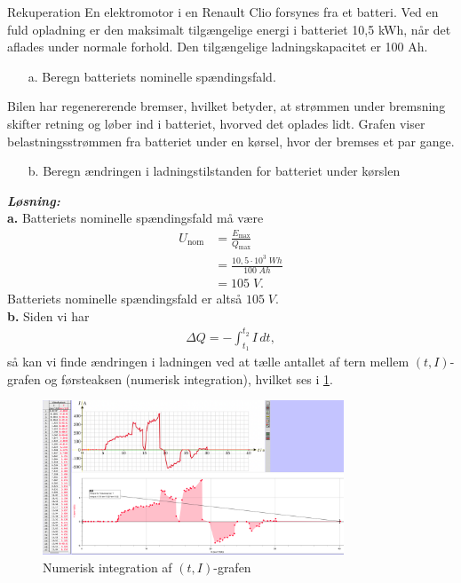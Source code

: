 \documentclass{report}
\newcommand{\sol}{\setlength{\parindent}{0cm}\textbf{\textit{Løsning:}}\setlength{\parindent}{1cm}}
\begin{document}
\begin{question}{Rekuperation}{}
  En elektromotor i en Renault Clio forsynes fra et batteri.
  Ved en fuld opladning er den maksimalt tilgængelige energi i batteriet 10,5 kWh, når det aflades under normale forhold.
  Den tilgængelige ladningskapacitet er 100 Ah.
  \begin{itemize}
    \item[a.] Beregn batteriets nominelle spændingsfald.
  \end{itemize}
Bilen har regenererende bremser, hvilket betyder, at strømmen under bremsning skifter retning og løber ind i batteriet, hvorved det oplades lidt.
Grafen viser belastningsstrømmen fra batteriet under en kørsel, hvor der bremses et par gange.
\begin{itemize}
  \item[b.] Beregn ændringen i ladningstilstanden for batteriet under kørslen
\end{itemize}
\end{question}
\sol \\
\textbf{a.}
Batteriets nominelle spændingsfald må være
\begin{equation*}
\begin{split}
  U _{\text{nom} }&=\frac{E _{\text{max} }}{Q _{\text{max} }}\\
  &=\frac{10,5 \cdot 10^3 \;\unit{Wh} }{100 \;\unit{Ah} }\\
  &=105 \;\unit{V}.
\end{split}
\end{equation*}
Batteriets nominelle spændingsfald er altså $105 \;\unit{V} $. \\[1ex]
\textbf{b.}
Siden vi har 
\begin{equation*}
\begin{split}
  \Delta Q = -\int_{t_1}^{t_2} I \,dt,
\end{split}
\end{equation*}
så kan vi finde ændringen i ladningen ved at tælle antallet af tern mellem $(t,I)$-grafen og førsteaksen (numerisk integration), hvilket ses i \cref{fig:rekup}.
\begin{figure}[H]
\begin{center}
  \includegraphics[width=0.8\textwidth]{rekup.png}
\end{center}
\caption{Numerisk integration af $(t, I)$-grafen}
\label{fig:rekup}
\end{figure}
\end{document}
